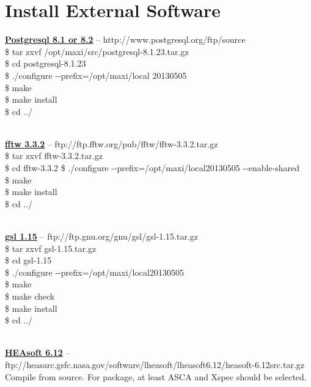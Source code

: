\documentclass[10pt]{report}
\renewcommand{\_}{\textscale{.5}{\textbf{\textunderscore}}}
\begin{document}
\section{Install External Software}\label{appsec:1.1}

\noindent\underline{\textbf{Postgresql 8.1 or 8.2}} -- http://www.postgresql.org/ftp/source\\

\noindent \$ tar zxvf /opt/maxi/src/postgresql-8.1.23.tar.gz\\
\$ cd postgresql-8.1.23\\
\$ ./configure -{}-prefix=/opt/maxi/local 20130505\\
\$ make\\
\$ make install\\
\$ cd ../\\

\

\noindent\underline{\textbf{fftw 3.3.2}} -- ftp://ftp.fftw.org/pub/fftw/fftw-3.3.2.tar.gz\\

\noindent \$ tar zxvf fftw-3.3.2.tar.gz\\
\$ cd fftw-3.3.2 \$ ./configure -{}-prefix=/opt/maxi/local\_20130505 -{}-enable-shared\\
\$ make\\
\$ make install\\
\$ cd ../\\

\

\noindent\underline{\textbf{gsl 1.15}} -- ftp://ftp.gnu.org/gnu/gsl/gsl-1.15.tar.gz\\

\noindent \$ tar zxvf gsl-1.15.tar.gz\\
\$ cd gsl-1.15\\
\$ ./configure -{}-prefix=/opt/maxi/local\_20130505\\
\$ make\\
\$ make check\\
\$ make install\\
\$ cd ../\\

\

\noindent\underline{\textbf{HEAsoft 6.12}} -- ftp://heasarc.gsfc.nasa.gov/software/lheasoft/lheasoft6.12/heasoft-6.12src.tar.gz\\

\noindent Compile from source. For package, at least ASCA and Xspec should be selected.\\
\end{document}
